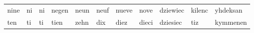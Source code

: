 \documentclass[a4paper, 20pt]{article}
\begin{document}
\begin{table}[]
\begin{tabular}{|lllllllllll|}
nine                                                 & ni                                                    & ni                                                   & negen                                                   & neun                                                 & neuf                                                   & nueve                                                  & nove                                                   & dziewiec                                             & kilenc                                                & yhdeksan                                             \\
ten                                                  & ti                                                    & ti                                                   & tien                                                    & zehn                                                 & dix                                                    & diez                                                   & dieci                                                  & dziesiec                                             & tiz                                                   & kymmenen                                             \\ \hline
\end{tabular}
\end{table}
\end{document}
